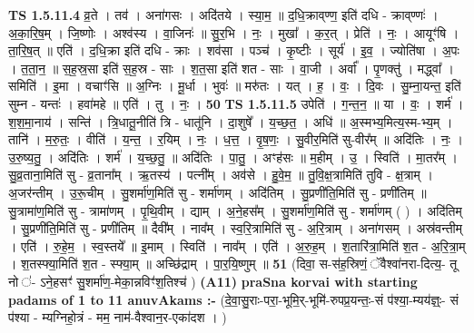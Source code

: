\documentclass[17pt]{extarticle}
\begin{document}
                  \newline
                                \textbf{ TS 1.5.11.4} \newline
                  व्र॒ते । तव॑ । अना॑गसः । अदि॑तये । स्या॒म॒ ॥ द॒धि॒क्राव्‌ण्ण॒ इति॑ दधि - क्राव्‌ण्णः॑ । अ॒का॒रि॒ष॒म् । जि॒ष्णोः । अश्व॑स्य । वा॒जिनः॑ ॥ सु॒र॒भि । नः॒ । मुखा᳚ । क॒र॒त् । प्रेति॑ । नः॒ । आयूꣳ॑षि । ता॒रि॒ष॒त् ॥ एति॑ । द॒धि॒क्रा इति॑ दधि - क्राः । शव॑सा । पञ्च॑ । कृ॒ष्टीः । सूर्य॑ । इ॒व॒ । ज्योति॑षा । अ॒पः । त॒ता॒न॒ ॥ स॒ह॒स्र॒सा इति॑ स॒ह॒स्र - साः । श॒त॒सा इति॑ शत - साः । वा॒जी । अर्वा᳚ । पृ॒णक्तु॑ । मद्ध्वा᳚ । समिति॑ । इ॒मा । वचाꣳ॑सि ॥ अ॒ग्निः । मू॒र्धा । भुवः॑ ॥ मरु॑तः । यत् । ह॒ । वः॒ । दि॒वः । सु॒म्ना॒यन्त॒ इति॑ सुम्न - यन्तः॑ । हवा॑महे ॥ एति॑ । तु । नः॒ । \textbf{  50} \newline
                  \newline
                                \textbf{ TS 1.5.11.5} \newline
                  उपेति॑ । ग॒न्त॒न॒ ॥ या । वः॒ । शर्म॑ । श॒श॒मा॒नाय॑ । सन्ति॑ । त्रि॒धातू॒नीति॑ त्रि - धातू॑नि । दा॒शुषे᳚ । य॒च्छ॒त॒ । अधि॑ ॥ अ॒स्मभ्य॒मित्य॒स्म-भ्य॒म् । तानि॑ । म॒रु॒तः॒ । वीति॑ । य॒न्त॒ । र॒यिम् । नः॒ । ध॒त्त॒ । वृ॒ष॒णः॒ । सु॒वीर॒मिति॑ सु-वीर᳚म् ॥ अदि॑तिः । नः॒ । उ॒रु॒ष्य॒तु॒ । अदि॑तिः । शर्म॑ । य॒च्छ॒तु॒ ॥ अदि॑तिः । पा॒तु॒ । अꣳह॑सः ॥ म॒हीम् । उ॒ । स्विति॑ । मा॒तर᳚म् । सु॒व्र॒ताना॒मिति॑ सु - व्र॒ताना᳚म् । ऋ॒तस्य॑ । पत्नी᳚म् । अव॑से । हु॒वे॒म॒ ॥ तु॒वि॒क्ष॒त्रामिति॑ तुवि - क्ष॒त्राम् । अ॒जर॑न्तीम् । उ॒रू॒चीम् । सु॒शर्मा॑ण॒मिति॑ सु - शर्मा॑णम् । अदि॑तिम् । सु॒प्रणी॑ति॒मिति॑ सु - प्रणी॑तिम् ॥ सु॒त्रामा॑ण॒मिति॑ सु - त्रामा॑णम् । पृ॒थि॒वीम् । द्याम् । अ॒ने॒हस᳚म् । सु॒शर्मा॑ण॒मिति॑ सु - शर्मा॑णम् ( ) । अदि॑तिम् । सु॒प्रणी॑ति॒मिति॑ सु - प्रणी॑तिम् ॥ दैवी᳚म् । नाव᳚म् । स्व॒रि॒त्रामिति॑ सु - अ॒रि॒त्राम् । अना॑गसम् । अस्र॑वन्तीम् । एति॑ । रु॒हे॒म॒ । स्व॒स्तये᳚ ॥ इ॒माम् । स्विति॑ । नाव᳚म् । एति॑ । अ॒रु॒ह॒म् । श॒तारि॑त्रा॒मिति॑ श॒त - अ॒रि॒त्रा॒म् । श॒तस्फ्या॒मिति॑ श॒त - स्फ्या॒म् ॥ अच्छि॑द्राम् । पा॒र॒यि॒ष्णुम् ॥ \textbf{  51} \newline
                  \newline
                      (दिवा॒ स-स॑ह॒स्रिणं॒ ॅवैश्वा॑नरा-दित्य॒- तू नो ॑- ऽने॒हसꣳ॑ सु॒शर्मा॑ण॒-मेका॒न्नविꣳ॑श॒तिश्च॑ )  \textbf{(A11)} \newline \newline
\textbf{praSna korvai with starting padams of 1 to 11 anuvAkams :-} \newline
(दे॒वा॒सु॒राः-परा॒-भूमि॒र्-भूमि॑-रुपप्र॒यन्तः॒-सं प॑श्या॒-म्यय॑ज्ञ्ः॒- सं प॑श्या - म्यग्निहो॒त्रं - मम॒ नाम॑-वैश्वान॒र-एका॑दश । ) \newline
\end{document}
